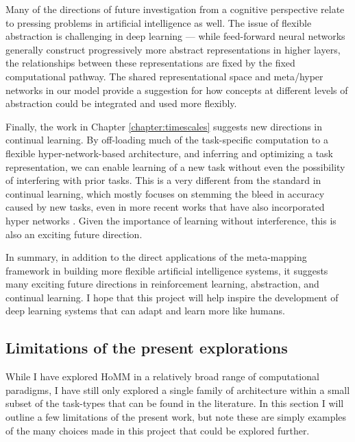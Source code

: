 Many of the directions of future investigation from a cognitive perspective relate to pressing problems in artificial intelligence as well. The issue of flexible abstraction is challenging in deep learning --- while feed-forward neural networks generally construct progressively more abstract representations in higher layers, the relationships between these representations are fixed by the fixed computational pathway. The shared representational space and meta/hyper networks in our model provide a suggestion for how concepts at different levels of abstraction could be integrated and used more flexibly. \par 

Finally, the work in Chapter \ref{chapter:timescales} suggests new directions in continual learning. By off-loading much of the task-specific computation to a flexible hyper-network-based architecture, and inferring and optimizing a task representation, we can enable learning of a new task without even the possibility of interfering with prior tasks. This is a very different from the standard in continual learning, which mostly focuses on stemming the bleed in accuracy caused by new tasks, even in more recent works that have also incorporated hyper networks \citep{Oswald2020}. Given the importance of learning without interference, this is also an exciting future direction. \par 

In summary, in addition to the direct applications of the meta-mapping framework in building more flexible artificial intelligence systems, it suggests many exciting future directions in reinforcement learning, abstraction, and continual learning. I hope that this project will help inspire the development of deep learning systems that can adapt and learn more like humans. \par 

\subsection{Limitations of the present explorations}

While I have explored HoMM in a relatively broad range of computational paradigms, I have still only explored a single family of architecture within a small subset of the task-types that can be found in the literature. In this section I will outline a few limitations of the present work, but note these are simply examples of the many choices made in this project that could be explored further. \par

